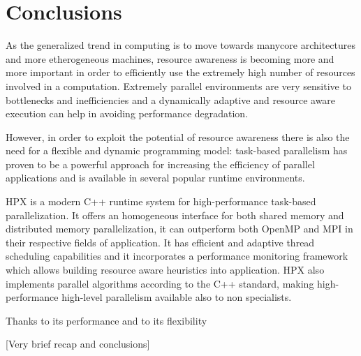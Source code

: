 
\section{Conclusions} \label{sec:conclusions}
As the generalized trend in computing is to move towards manycore architectures and more etherogeneous machines, resource awareness is becoming more and more important in order to efficiently use the extremely high number of resources involved in a computation.
Extremely parallel environments are very sensitive to bottlenecks and inefficiencies and a dynamically adaptive and resource aware execution can help in avoiding performance degradation.

However, in order to exploit the potential of resource awareness there is also the need for a flexible and dynamic programming model: task-based parallelism has proven to be a powerful approach for increasing the efficiency of parallel applications and is available in several popular runtime environments.

HPX is a modern C++ runtime system for high-performance task-based parallelization. It offers an homogeneous interface for both shared memory and distributed memory parallelization, it can outperform both OpenMP and MPI in their respective fields of application. It has efficient and adaptive thread scheduling capabilities and it incorporates a performance monitoring framework which allows building resource aware heuristics into application.
HPX also implements parallel algorithms according to the C++ standard, making high-performance high-level parallelism available also to non specialists.

Thanks to its performance and to its flexibility

[\TODO Very brief recap and conclusions]

~\\~
